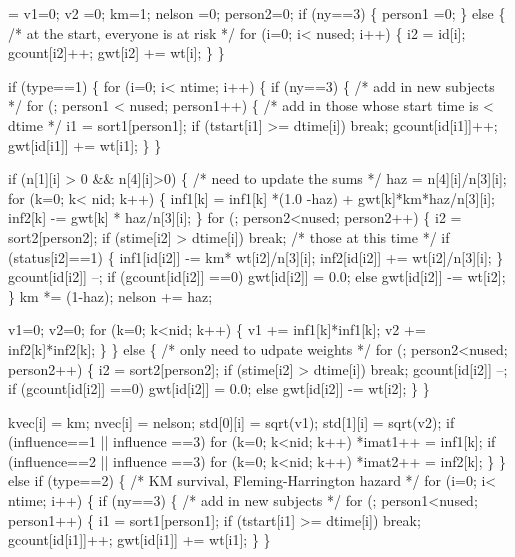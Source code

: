 \documentclass{article}
\begin{document}
\begin{nwchunk}
=
 v1=0; v2 =0; km=1; nelson =0;
 person2=0; 
 if (ny==3) \{
     person1 =0;
 \} else \{
     /* at the start, everyone is at risk */
     for (i=0; i< nused; i++) \{
         i2 = id[i];
         gcount[i2]++;
         gwt[i2] += wt[i];
     \}
 \}
     
 if (type==1) \{
     for (i=0; i< ntime; i++) \{
         if (ny==3) \{
             /* add in new subjects */
             for (; person1 < nused; person1++) \{
                 /* add in those whose start time is < dtime */
                 i1 = sort1[person1];
                 if (tstart[i1] >= dtime[i]) break;  
                 gcount[id[i1]]++;
                 gwt[id[i1]] += wt[i1];
             \}
         \}
  
         if (n[1][i] > 0 && n[4][i]>0) \{ /* need to update the sums */
             haz = n[4][i]/n[3][i];
             for (k=0; k< nid; k++) \{
                 inf1[k] = inf1[k] *(1.0 -haz) + gwt[k]*km*haz/n[3][i];
                 inf2[k] -= gwt[k] * haz/n[3][i];
             \}
             for (; person2<nused; person2++) \{ 
                 i2 = sort2[person2];
                 if (stime[i2] > dtime[i]) break;   /* those at this time */
                 if (status[i2]==1) \{
                     inf1[id[i2]] -= km* wt[i2]/n[3][i];
                     inf2[id[i2]] += wt[i2]/n[3][i];
                 \}
                 gcount[id[i2]] --;
                 if (gcount[id[i2]] ==0) gwt[id[i2]] = 0.0;
                 else gwt[id[i2]] -= wt[i2];
             \}
             km *= (1-haz);
             nelson += haz;
            
             v1=0; v2=0;
             for (k=0; k<nid; k++) \{
                 v1 += inf1[k]*inf1[k];
                 v2 += inf2[k]*inf2[k];
             \}
         \} else \{  /* only need to udpate weights */
             for (; person2<nused; person2++) \{ 
                 i2 = sort2[person2];
                 if (stime[i2] > dtime[i]) break;
                 gcount[id[i2]] --;
                 if (gcount[id[i2]] ==0) gwt[id[i2]] = 0.0;
                 else gwt[id[i2]] -= wt[i2];
             \}
         \}
  
         kvec[i] = km;
         nvec[i] = nelson;
         std[0][i] = sqrt(v1);
         std[1][i] = sqrt(v2);
         if (influence==1 || influence ==3) 
             for (k=0; k<nid; k++) *imat1++ = inf1[k];
         if (influence==2 || influence ==3)
             for (k=0; k<nid; k++) *imat2++ = inf2[k];
     \}
 \}
 else if (type==2) \{  /* KM survival, Fleming-Harrington hazard */
     for (i=0; i< ntime; i++) \{
         if (ny==3) \{
             /* add in new subjects */
             for (; person1<nused; person1++) \{
                 i1 = sort1[person1];
                 if (tstart[i1] >= dtime[i]) break;
                 gcount[id[i1]]++;
                 gwt[id[i1]] += wt[i1];
             \}
         \}
  

\end{nwchunk}
\end{document}
